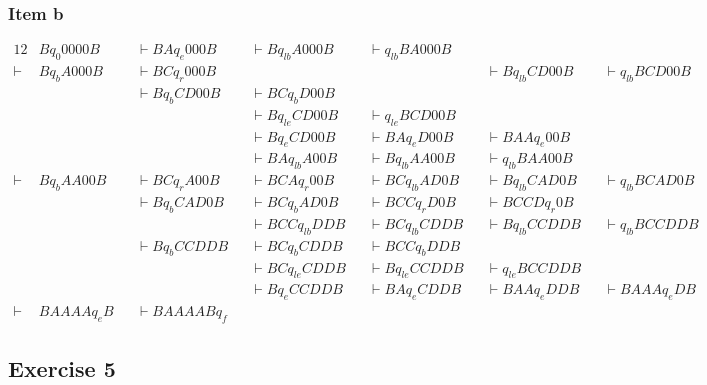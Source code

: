 {\subsubsection{Item b}
\begin{alignat*}{12}
	       & B q_0 0000B &&\vdash BA q_e 000B &&\vdash B q_{lb} A000B &&\vdash q_{lb} BA000B  && \\
	\vdash & B q_b A000B &&\vdash BC q_r 000B &&                      &&                      &&\vdash B q_{lb} CD00B &&\vdash q_{lb} BCD00B   && \\
		   &             &&\vdash B q_b CD00B &&\vdash BC q_b D00B    &&\\
		   &             &&                   &&\vdash B q_{le} CD00B &&\vdash q_{le} BCD00B  &&\\
		   &             &&                   &&\vdash B q_e CD00B    &&\vdash BA q_e D00B    &&\vdash BAA q_e 00B    &&\\
		   &             &&                   &&\vdash BA q_{lb} A 00B &&\vdash B q_{lb} AA00B &&\vdash q_{lb} BAA00B && \\
	\vdash & B q_b AA00B &&\vdash BC q_r A00B &&\vdash BCA q_r 00B    &&\vdash BC q_{lb} AD0B &&\vdash B q_{lb} CAD0B &&\vdash q_{lb} BCAD0B   &&\\  
		   &             &&\vdash B q_b CAD0B &&\vdash BC q_b AD0B    &&\vdash BCC q_r D0B    &&\vdash BCCD q_r 0B    &&\\
		   &             &&                   &&\vdash BCC q_{lb} DDB &&\vdash BC q_{lb} CDDB &&\vdash B q_{lb} CCDDB &&\vdash  q_{lb} BCCDDB &&\\
		   &             &&\vdash B q_b CCDDB &&\vdash BC q_b CDDB    &&\vdash BCC q_b DDB    &&\\
		   &             &&                   &&\vdash BC q_{le} CDDB &&\vdash B q_{le} CCDDB &&\vdash q_{le} BCCDDB  &&\\
		   &             &&                   &&\vdash B q_e CCDDB    &&\vdash BA q_e CDDB    &&\vdash BAA q_e DDB    &&\vdash BAAA q_e DB    &&\\
	\vdash & BAAAA q_e B &&\vdash BAAAAB q_f 
\end{alignat*}
\subsection{Exercise 5}
}
